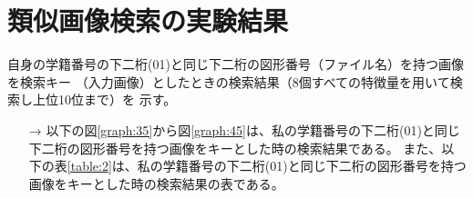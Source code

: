 \section{類似画像検索の実験結果}
自身の学籍番号の下二桁(01)と同じ下二桁の図形番号（ファイル名）を持つ画像を検索キー
（入力画像）としたときの検索結果（8個すべての特徴量を用いて検索し上位10位まで）を
示す。

\begin{itemize}
  \item[→] 以下の図\ref{graph:35}から図\ref{graph:45}は、私の学籍番号の下二桁(01)と同じ下二桁の図形番号を持つ画像をキーとした時の検索結果である。
  また、以下の表\ref{table:2}は、私の学籍番号の下二桁(01)と同じ下二桁の図形番号を持つ画像をキーとした時の検索結果の表である。
\end{itemize}

